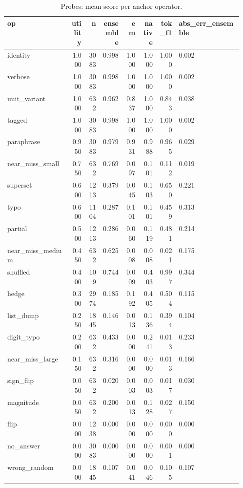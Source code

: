 \begin{table}[htbp]
\centering\tiny
\caption{Probes: mean score per anchor operator.}
\label{tab:probes}
\setlength{\tabcolsep}{3pt}
\begin{tabular}{p{0.279\linewidth}rrrrrrp{0.279\linewidth}}
\toprule
op & utility & n & ensemble & em & native & tok\_\allowbreak{}f1 & abs\_\allowbreak{}err\_\allowbreak{}ensemble \\
\midrule
identity & 1.000 & 3083 & 0.998 & 1.000 & 1.000 & 1.000 & 0.002 \\
verbose & 1.000 & 3083 & 0.998 & 1.000 & 1.000 & 1.000 & 0.002 \\
unit\_\allowbreak{}variant & 1.000 & 632 & 0.962 & 0.837 & 1.000 & 0.843 & 0.038 \\
tagged & 1.000 & 3083 & 0.998 & 1.000 & 1.000 & 1.000 & 0.002 \\
paraphrase & 0.950 & 3083 & 0.979 & 0.931 & 0.988 & 0.965 & 0.029 \\
near\_\allowbreak{}miss\_\allowbreak{}small & 0.750 & 632 & 0.769 & 0.097 & 0.101 & 0.112 & 0.019 \\
superset & 0.600 & 1213 & 0.379 & 0.045 & 0.103 & 0.650 & 0.221 \\
typo & 0.600 & 1104 & 0.287 & 0.101 & 0.101 & 0.459 & 0.313 \\
partial & 0.500 & 1213 & 0.286 & 0.060 & 0.119 & 0.481 & 0.214 \\
near\_\allowbreak{}miss\_\allowbreak{}medium & 0.450 & 632 & 0.625 & 0.008 & 0.008 & 0.021 & 0.175 \\
shuffled & 0.400 & 109 & 0.744 & 0.009 & 0.403 & 0.997 & 0.344 \\
hedge & 0.300 & 2974 & 0.185 & 0.192 & 0.405 & 0.504 & 0.115 \\
list\_\allowbreak{}dump & 0.250 & 1845 & 0.146 & 0.013 & 0.136 & 0.394 & 0.104 \\
digit\_\allowbreak{}typo & 0.200 & 632 & 0.433 & 0.000 & 0.241 & 0.013 & 0.233 \\
near\_\allowbreak{}miss\_\allowbreak{}large & 0.150 & 632 & 0.316 & 0.000 & 0.000 & 0.013 & 0.166 \\
sign\_\allowbreak{}flip & 0.050 & 632 & 0.020 & 0.003 & 0.003 & 0.017 & 0.030 \\
magnitude & 0.050 & 632 & 0.200 & 0.013 & 0.128 & 0.027 & 0.150 \\
flip & 0.000 & 1238 & 0.000 & 0.000 & 0.000 & 0.000 & 0.000 \\
no\_\allowbreak{}answer & 0.000 & 3083 & 0.000 & 0.000 & 0.000 & 0.001 & 0.000 \\
wrong\_\allowbreak{}random & 0.000 & 1845 & 0.107 & 0.041 & 0.046 & 0.105 & 0.107 \\
\bottomrule
\end{tabular}
\end{table}
